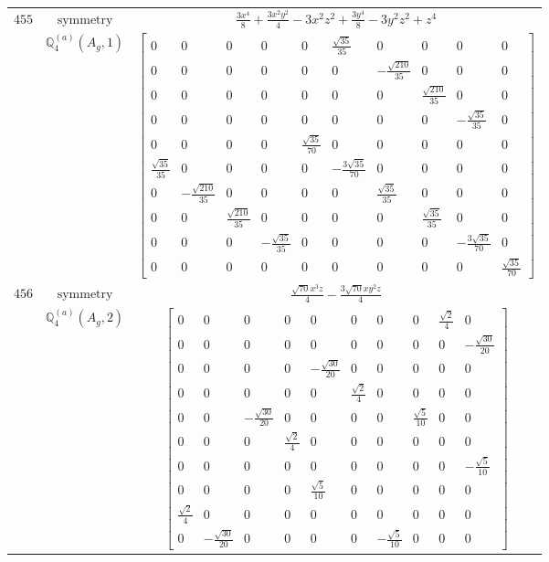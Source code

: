 \documentclass[fleqn,8pt,landscape]{jsarticle}
\begin{document}
\begin{longtable}{ccc}
$ 455 $ & $ \text{symmetry} $ & $ \frac{3 x^{4}}{8} + \frac{3 x^{2} y^{2}}{4} - 3 x^{2} z^{2} + \frac{3 y^{4}}{8} - 3 y^{2} z^{2} + z^{4} $ \\
$  $ & $ \mathbb{Q}_{4}^{(a)}(A_{g},1) $ & $ \begin{bmatrix} 0 & 0 & 0 & 0 & 0 & \frac{\sqrt{35}}{35} & 0 & 0 & 0 & 0 \\ 0 & 0 & 0 & 0 & 0 & 0 & - \frac{\sqrt{210}}{35} & 0 & 0 & 0 \\ 0 & 0 & 0 & 0 & 0 & 0 & 0 & \frac{\sqrt{210}}{35} & 0 & 0 \\ 0 & 0 & 0 & 0 & 0 & 0 & 0 & 0 & - \frac{\sqrt{35}}{35} & 0 \\ 0 & 0 & 0 & 0 & \frac{\sqrt{35}}{70} & 0 & 0 & 0 & 0 & 0 \\ \frac{\sqrt{35}}{35} & 0 & 0 & 0 & 0 & - \frac{3 \sqrt{35}}{70} & 0 & 0 & 0 & 0 \\ 0 & - \frac{\sqrt{210}}{35} & 0 & 0 & 0 & 0 & \frac{\sqrt{35}}{35} & 0 & 0 & 0 \\ 0 & 0 & \frac{\sqrt{210}}{35} & 0 & 0 & 0 & 0 & \frac{\sqrt{35}}{35} & 0 & 0 \\ 0 & 0 & 0 & - \frac{\sqrt{35}}{35} & 0 & 0 & 0 & 0 & - \frac{3 \sqrt{35}}{70} & 0 \\ 0 & 0 & 0 & 0 & 0 & 0 & 0 & 0 & 0 & \frac{\sqrt{35}}{70} \end{bmatrix} $ \\ \hline
$ 456 $ & $ \text{symmetry} $ & $ \frac{\sqrt{70} x^{3} z}{4} - \frac{3 \sqrt{70} x y^{2} z}{4} $ \\
$  $ & $ \mathbb{Q}_{4}^{(a)}(A_{g},2) $ & $ \begin{bmatrix} 0 & 0 & 0 & 0 & 0 & 0 & 0 & 0 & \frac{\sqrt{2}}{4} & 0 \\ 0 & 0 & 0 & 0 & 0 & 0 & 0 & 0 & 0 & - \frac{\sqrt{30}}{20} \\ 0 & 0 & 0 & 0 & - \frac{\sqrt{30}}{20} & 0 & 0 & 0 & 0 & 0 \\ 0 & 0 & 0 & 0 & 0 & \frac{\sqrt{2}}{4} & 0 & 0 & 0 & 0 \\ 0 & 0 & - \frac{\sqrt{30}}{20} & 0 & 0 & 0 & 0 & \frac{\sqrt{5}}{10} & 0 & 0 \\ 0 & 0 & 0 & \frac{\sqrt{2}}{4} & 0 & 0 & 0 & 0 & 0 & 0 \\ 0 & 0 & 0 & 0 & 0 & 0 & 0 & 0 & 0 & - \frac{\sqrt{5}}{10} \\ 0 & 0 & 0 & 0 & \frac{\sqrt{5}}{10} & 0 & 0 & 0 & 0 & 0 \\ \frac{\sqrt{2}}{4} & 0 & 0 & 0 & 0 & 0 & 0 & 0 & 0 & 0 \\ 0 & - \frac{\sqrt{30}}{20} & 0 & 0 & 0 & 0 & - \frac{\sqrt{5}}{10} & 0 & 0 & 0 \end{bmatrix} $ \\ \hline

\end{longtable}
\end{document}

